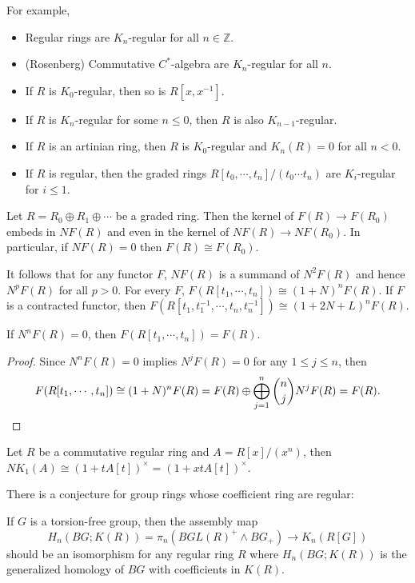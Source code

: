 For example,
\begin{itemize}
	\item Regular rings are $K_n$-regular for all $n\in \mathbb{Z}$.
	\item (Rosenberg) Commutative $C^*$-algebra are $K_n$-regular for all $n$. 
	\item If $R$ is $K_0$-regular, then so is $R[x,x^{-1}]$.
	\item If $R$ is $K_n$-regular for some $n\leq 0$, then $R$ is also $K_{n-1}$-regular.
	\item If $R$ is an artinian ring, then $R$ is $K_0$-regular and $K_{n}(R)=0$ for all $n<0$.
	\item If $R$ is regular, then the graded rings $R[t_0,\cdots,t_n]/(t_0\cdots t_n)$ are $K_i$-regular for $i\leq 1$.
\end{itemize}
\begin{lemma}
	 Let $R = R_0 \oplus R_1 \oplus \cdots$ be a graded ring. Then the kernel of $F(R) \longrightarrow F(R_0)$ embeds in $NF(R)$ and even in the kernel of $NF(R) \longrightarrow NF(R_0)$. In particular, if $NF(R) = 0$ then $F(R) \cong F(R_0)$.
\end{lemma}
It follows that for any functor $F$, $NF(R)$ is a summand of $N^2F(R)$ and hence $N^pF(R)$ for all $p > 0$. For every $F$, $F(R[t_1,\cdots,t_n])\cong (1 + N)^n F(R)$. If $F$ is a contracted functor, then $F(R[t_1,t_1^{-1},\cdots,t_n ,t_n^{-1}]) \cong (1 + 2N + L)^n F(R)$.
\begin{corollary}
	If $N^nF(R)=0$, then $F(R[t_1,\cdots,t_n])=F(R)$.
\end{corollary}
\begin{proof}
	Since $N^nF(R)=0$ implies $N^jF(R)=0$ for any $1\leq j\leq n$, then 
	\[F(R[t_1,\cdots,t_n])\cong (1 + N)^n F(R)=F(R)\oplus \bigoplus_{j=1}^n \binom{n}{j}N^jF(R)=F(R). \qedhere \]
\end{proof}
\begin{example}
	Let $R$ be a commutative regular ring and $A=R[x]/(x^n)$, then $NK_1(A)\cong (1+tA[t])^{\times}=(1+xtA[t])^{\times}$.
\end{example}
There is a conjecture for group rings whose coefficient	ring are regular: 
\begin{conjecture}
	If $G$ is a torsion-free group, then the assembly map 
	\[H_n(BG;K(R))=\pi_n(BGL(R)^+\wedge BG_+)\longrightarrow K_n(R[G])\]
	should be an isomorphism for any regular ring $R$ where $H_n(BG;K(R))$ is the generalized homology of $BG$ with coefficients in $K(R)$.
\end{conjecture}


